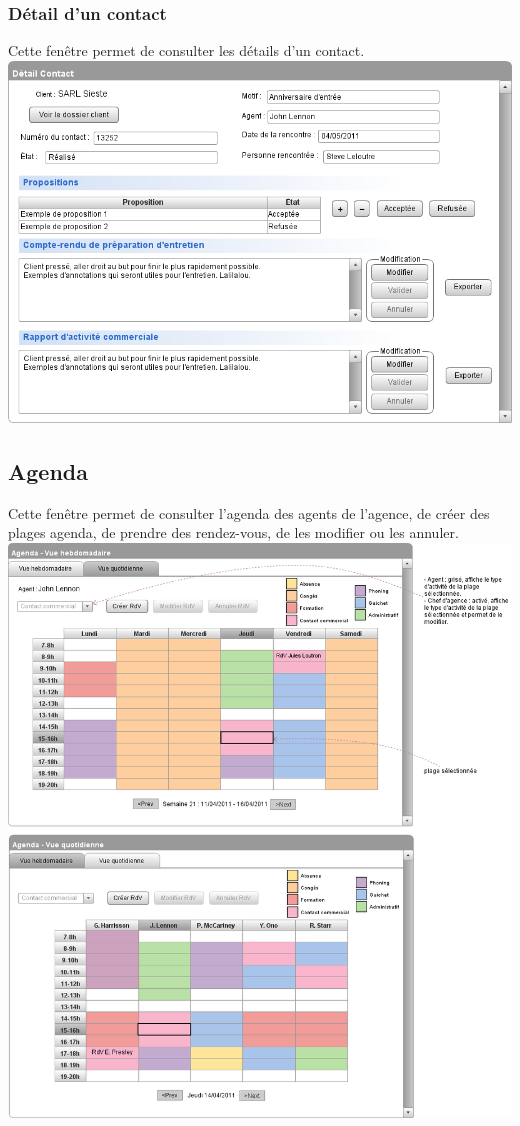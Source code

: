 		\subsubsection{Détail d'un contact}
		Cette fenêtre permet de consulter les détails d'un contact. \\
		\includegraphics[width=\linewidth]{IHM/Detail_Contact.png}
		
		\newpage
		
	\subsection{Agenda}
		Cette fenêtre permet de consulter l'agenda des agents de l'agence, de créer des plages agenda, de prendre des rendez-vous, de les modifier ou les annuler. \\
		\includegraphics[width=\linewidth]{IHM/Agenda.png}
		
		\newpage